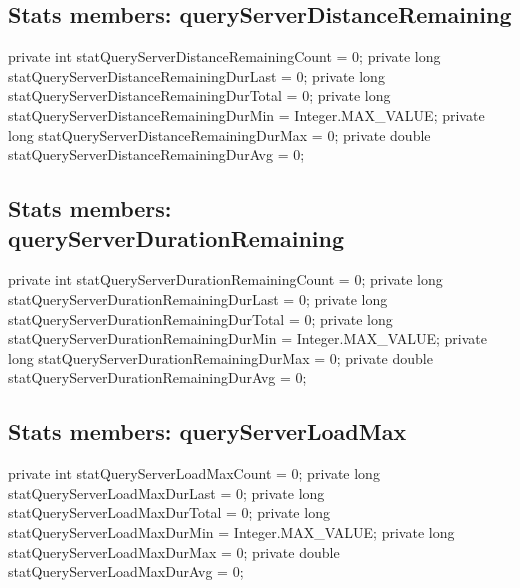 \subsection{Stats members: queryServerDistanceRemaining}
\nwenddocs{}\endmoddef{}
private int    statQueryServerDistanceRemainingCount    = 0;
private long   statQueryServerDistanceRemainingDurLast  = 0;
private long   statQueryServerDistanceRemainingDurTotal = 0;
private long   statQueryServerDistanceRemainingDurMin   = Integer.MAX_VALUE;
private long   statQueryServerDistanceRemainingDurMax   = 0;
private double statQueryServerDistanceRemainingDurAvg   = 0;
\nwendcode{}\nwdocspar

\subsection{Stats members: queryServerDurationRemaining}
\nwenddocs{}\endmoddef{}
private int    statQueryServerDurationRemainingCount    = 0;
private long   statQueryServerDurationRemainingDurLast  = 0;
private long   statQueryServerDurationRemainingDurTotal = 0;
private long   statQueryServerDurationRemainingDurMin   = Integer.MAX_VALUE;
private long   statQueryServerDurationRemainingDurMax   = 0;
private double statQueryServerDurationRemainingDurAvg   = 0;
\nwendcode{}\nwdocspar

\subsection{Stats members: queryServerLoadMax}
\nwenddocs{}\endmoddef{}
private int    statQueryServerLoadMaxCount    = 0;
private long   statQueryServerLoadMaxDurLast  = 0;
private long   statQueryServerLoadMaxDurTotal = 0;
private long   statQueryServerLoadMaxDurMin   = Integer.MAX_VALUE;
private long   statQueryServerLoadMaxDurMax   = 0;
private double statQueryServerLoadMaxDurAvg   = 0;
\nwendcode{}\nwdocspar

